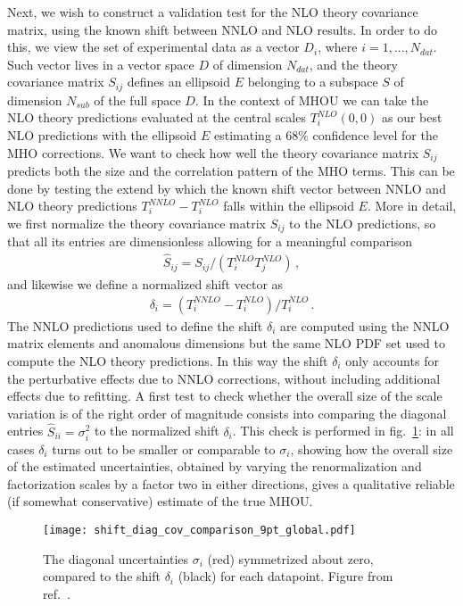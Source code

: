     Next, we wish to construct a validation test for the NLO theory covariance matrix, using the known shift between
    NNLO and NLO results.
    In order to do this, we view the set of experimental data as a vector $D_i$, where $i = 1, ..., N_{dat}$.
    Such vector lives in a vector space $D$ of dimension $N_{dat}$, and
    the theory covariance matrix $S_{ij}$ defines an ellipsoid $E$ belonging to a subspace $S$ of dimension
    $N_{sub}$ of the full space $D$. 
    In the context of MHOU we can take the NLO theory predictions evaluated at the central scales $T_i^{NLO}\left(0,0\right)$
    as our best NLO predictions with the ellipsoid $E$ estimating a $68\%$ confidence level for the MHO corrections. 
    We want to check how well the theory covariance matrix $S_{ij}$ predicts both the size and the correlation pattern
    of the MHO terms. This can be done by testing the extend by which the known shift vector between NNLO and NLO theory predictions
    $T_i^{NNLO} - T_i^{NLO}$
    falls within the ellipsoid $E$.
    More in detail, we first normalize the theory covariance matrix $S_{ij}$ to the NLO predictions, so that all its
    entries are dimensionless allowing for a meaningful comparison 
    \begin{align}
        \hat{S}_{ij} = S_{ij}/\left(T_i^{NLO}T_j^{NLO}\right)\,,
    \end{align}
    and likewise we define a normalized shift vector as
    \begin{align}
        \delta_i = \left(T_i^{NNLO}-T_i^{NLO}\right)/T_i^{NLO}\,.
    \end{align}
    The NNLO predictions used to define the shift $\delta_i$ are computed using the NNLO matrix elements and anomalous dimensions
    but the same NLO PDF set used to compute the NLO theory predictions. In this way the shift $\delta_i$ 
    only accounts for the perturbative effects due to NNLO corrections, without including additional effects
    due to refitting.
    A first test to check whether the overall size of the scale variation is of the right order of magnitude
    consists into comparing the diagonal entries $\hat{S}_{ii} = \sigma_i^2$ to the normalized shift $\delta_i$.
    This check is performed in fig.~\ref{fig:diag_shift_validation_symmetric}: in all cases 
    $\delta_i$ turns out to be smaller or comparable to $\sigma_i$, showing how
    the overall size of the estimated uncertainties, obtained by varying the renormalization and factorization scales by
    a factor two in either directions, gives a qualitative reliable (if somewhat conservative) estimate of the true MHOU. 
    \begin{figure}[t!]
        \begin{center}
          \texttt{[image: shift\_diag\_cov\_comparison\_9pt\_global.pdf]}
          \caption{\small The diagonal uncertainties  $\sigma_i$ (red)
            symmetrized about zero,
            compared to the shift $\delta_i$ (black) for each
            datapoint. Figure from ref.~\cite{AbdulKhalek:2019ihb}.}
          \label{fig:diag_shift_validation_symmetric}
        \end{center}
    \end{figure}

